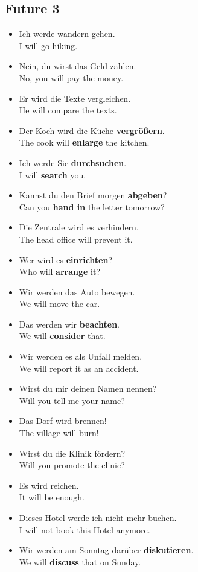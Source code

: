 \pagebreak
\subsection{Future 3}

\begin{itemize}
  \item  Ich werde wandern gehen. \\
  I will go hiking.
  \item  Nein, du wirst das Geld zahlen. \\
  No, you will pay the money.
  \item  Er wird die Texte vergleichen. \\
  He will compare the texts.
  \item  Der Koch wird die K{\"u}che \textbf{vergr{\"o}{\ss}ern}. \\
  The cook will \textbf{enlarge} the kitchen.
  \item  Ich werde Sie \textbf{durchsuchen}. \\
  I will \textbf{search} you.
  \item  Kannst du den Brief morgen \textbf{abgeben}? \\
  Can you \textbf{hand in} the letter tomorrow?
  \item  Die Zentrale wird es verhindern. \\
  The head office will prevent it.
  \item  Wer wird es \textbf{einrichten}? \\
  Who will \textbf{arrange} it?
  \item  Wir werden das Auto bewegen. \\
  We will move the car.
  \item  Das werden wir \textbf{beachten}. \\
  We will \textbf{consider} that.
  \item  Wir werden es als Unfall melden. \\
  We will report it as an accident.
  \item  Wirst du mir deinen Namen nennen? \\
  Will you tell me your name?
  \item  Das Dorf wird brennen! \\
  The village will burn!
  \item  Wirst du die Klinik f{\"o}rdern? \\
  Will you promote the clinic?
  \item  Es wird reichen. \\
  It will be enough.
  \item  Dieses Hotel werde ich nicht mehr buchen. \\
  I will not book this Hotel anymore.
  \item  Wir werden am Sonntag dar{\"u}ber \textbf{diskutieren}. \\
  We will \textbf{discuss} that on Sunday.
\end{itemize}


